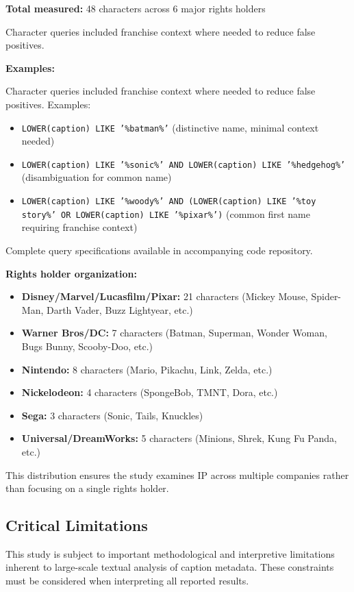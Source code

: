 \documentclass[11pt]{article}
\begin{document}
\textbf{Total measured:} 48 characters across 6 major rights holders

Character queries included franchise context where needed to reduce false positives. 

\textbf{Examples:}



Character queries included franchise context where needed to reduce false positives. Examples:

\begin{itemize}
\item \texttt{LOWER(caption) LIKE '\%batman\%'} (distinctive name, minimal context needed)
\item \texttt{LOWER(caption) LIKE '\%sonic\%' AND LOWER(caption) LIKE '\%hedgehog\%'} (disambiguation for common name)
\item \texttt{LOWER(caption) LIKE '\%woody\%' AND (LOWER(caption) LIKE '\%toy story\%' OR LOWER(caption) LIKE '\%pixar\%')} (common first name requiring franchise context)
\end{itemize}



Complete query specifications available in accompanying code repository.

\textbf{Rights holder organization:}

\begin{itemize}

\item \textbf{Disney/Marvel/Lucasfilm/Pixar:} 21 characters (Mickey Mouse, Spider-Man, Darth Vader, Buzz Lightyear, etc.)
\item \textbf{Warner Bros/DC:} 7 characters (Batman, Superman, Wonder Woman, Bugs Bunny, Scooby-Doo, etc.)
\item \textbf{Nintendo:} 8 characters (Mario, Pikachu, Link, Zelda, etc.)
\item \textbf{Nickelodeon:} 4 characters (SpongeBob, TMNT, Dora, etc.)
\item \textbf{Sega:} 3 characters (Sonic, Tails, Knuckles)
\item \textbf{Universal/DreamWorks:} 5 characters (Minions, Shrek, Kung Fu Panda, etc.)

\end{itemize}

This distribution ensures the study examines IP across multiple companies rather than focusing on a single rights holder.


\subsection{Critical Limitations}
This study is subject to important methodological and interpretive limitations inherent to large-scale textual analysis of caption metadata. These constraints must be considered when interpreting all reported results.
\end{document}
